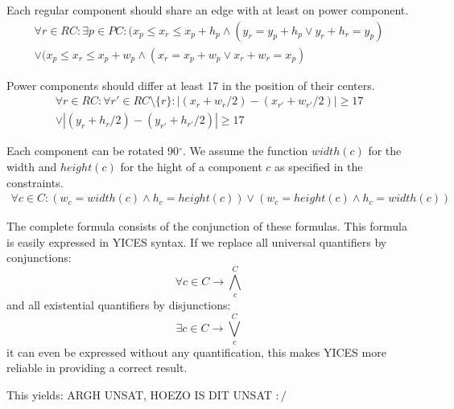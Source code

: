 \documentclass[12pt]{article}
\begin{document}
\vspace{3mm}

Each regular component should share an edge with at least on power component.
\begin{multline}
	\forall r \in RC : \exists p \in PC :
		(x_p \leq x_r \le x_p+h_p \wedge (y_r=y_p+h_p \vee y_r+h_r=y_p)  \\  
		\vee (x_p \leq x_r \le x_p+w_p \wedge (x_r=x_p+w_p \vee x_r+w_r=x_p)
\end{multline}

\vspace{3mm}

Power components should differ at least 17 in the position of their centers.
\begin{multline}
	\forall r \in RC : \forall r' \in RC \setminus \{r\} :
		|(x_r + w_r/2) - (x_{r'} + w_{r'}/2)| \geq 17 \\  
		\vee |(y_r + h_r/2) - (y_{r'} + h_{r'}/2)| \geq 17
\end{multline}

Each component can be rotated 90$^{\circ}$. We assume the function 
$width(c)$ for the width and $height(c)$ for the hight of a component $c$ as
specified in the constraints. 
\begin{multline}
	\forall c \in C : (w_c = width(c) \wedge h_c = height(c))
		\vee (w_c = height(c) \wedge h_c = width(c))
\end{multline}

The complete formula consists of the conjunction of these formulas. This
formula is easily expressed in YICES syntax. If we replace all universal
quantifiers by conjunctions:
\begin{equation}
	\forall c \in C \rightarrow \bigwedge_c^C
\end{equation}
and all existential quantifiers by disjunctions:
\begin{equation}
	\exists c \in C \rightarrow \bigvee_c^C
\end{equation}
it can even be expressed without any quantification, this makes YICES more
reliable in providing a correct result.

This yields: ARGH UNSAT, HOEZO IS DIT UNSAT $:/$
\end{document}
